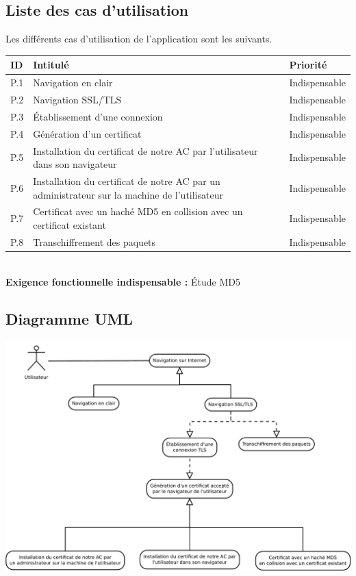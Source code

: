\documentclass[a4paper,11pt,french]{article}
\begin{document}
\subsection{Liste des cas d'utilisation}

Les différents cas d'utilisation de l'application sont les suivants.

\begin{center}
\begin{tabular}{|l|m{12cm}|l|}
\hline 
\rowcolor[gray]{.8} ID & Intitulé & Priorité \\ 
\hline
P.1 & Navigation en clair & Indispensable\\
\hline
P.2 & Navigation SSL/TLS & Indispensable \\ 
\hline
P.3 & Établissement d'une connexion & Indispensable \\
P.4 & Génération d'un certificat & Indispensable \\ 
\hline 
P.5 & Installation du certificat de notre AC par l'utilisateur dans son navigateur
 & Indispensable \\ 
\hline 
P.6 & Installation du certificat de notre AC par un administrateur sur la machine de l'utilisateur  & Indispensable \\ 
 \hline
P.7 & Certificat avec un haché MD5
en collision avec un certificat existant & Indispensable \\
\hline
P.8 & Transchiffrement des paquets & Indispensable \\
\hline
 

\end{tabular} 
\end{center}
~~\\
\textbf{Exigence fonctionnelle indispensable :} Étude MD5
~~\\

\huge
\subsection{Diagramme UML}
\begin{center}
\includegraphics[width=\textwidth]{images/cas_utilisation.pdf}
\end{center}
\normalsize
\end{document}
